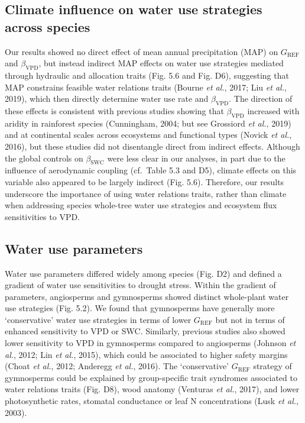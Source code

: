 \documentclass[11pt,twoside]{reedthesis}
\begin{document}
\subsection{Climate influence on water use strategies across
species}\label{climate-influence-on-water-use-strategies-across-species}

Our results showed no direct effect of mean annual precipitation (MAP)
on \(G_{\text{REF}}\) and \(\beta_{\text{VPD}}\), but instead indirect
MAP effects on water use strategies mediated through hydraulic and
allocation traits (Fig. 5.6 and Fig. D6), suggesting that MAP constrains
feasible water relations traits (Bourne \emph{et al.}, 2017; Liu
\emph{et al.}, 2019), which then directly determine water use rate and
\(\beta_{\text{VPD}}\). The direction of these effects is consistent
with previous studies showing that \(\beta_{\text{VPD}}\) increased with
aridity in rainforest species (Cunningham, 2004; but see Grossiord
\emph{et al.}, 2019) and at continental scales across ecosystems and
functional types (Novick \emph{et al.}, 2016), but these studies did not
disentangle direct from indirect effects. Although the global controls
on \(\beta_{\text{SWC}}\) were less clear in our analyses, in part due
to the influence of aerodynamic coupling (cf.~Table 5.3 and D5), climate
effects on this variable also appeared to be largely indirect (Fig.
5.6). Therefore, our results underscore the importance of using water
relations traits, rather than climate when addressing species whole-tree
water use strategies and ecosystem flux sensitivities to VPD.\par

\subsection{Water use parameters}\label{water-use-parameters}

Water use parameters differed widely among species (Fig. D2) and defined
a gradient of water use sensitivities to drought stress. Within the
gradient of parameters, angiosperms and gymnosperms showed distinct
whole-plant water use strategies (Fig. 5.2). We found that gymnosperms
have generally more `conservative' water use strategies in terms of
lower \(G_{\text{REF}}\) but not in terms of enhanced sensitivity to VPD
or SWC. Similarly, previous studies also showed lower sensitivity to VPD
in gymnosperms compared to angiosperms (Johnson \emph{et al.}, 2012; Lin
\emph{et al.}, 2015), which could be associated to higher safety margins
(Choat \emph{et al.}, 2012; Anderegg \emph{et al.}, 2016). The
`conservative' \(G_{\text{REF}}\) strategy of gymnosperms could be
explained by group-specific trait syndromes associated to water
relations traits (Fig. D8), wood anatomy (Venturas \emph{et al.}, 2017),
and lower photosynthetic rates, stomatal conductance or leaf N
concentrations (Lusk \emph{et al.}, 2003).\par
\end{document}
